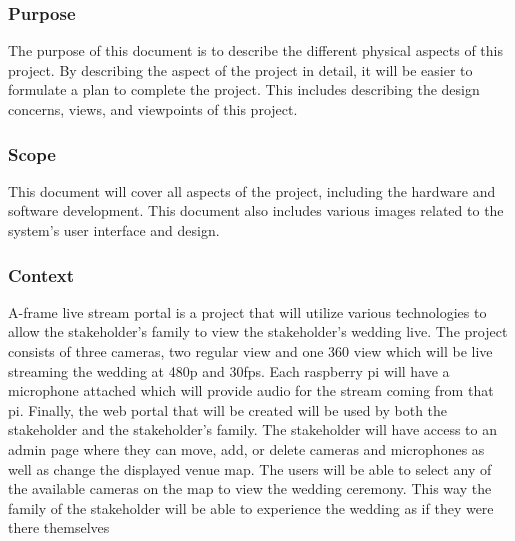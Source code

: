 \documentclass[onecolumn, draftclsnofoot,10pt, compsoc]{IEEEtran}
\begin{document}
    \subsubsection{Purpose}
    The purpose of this document is to describe the different physical aspects of this project.
    By describing the aspect of the project in detail, it will be easier to formulate a plan to complete the project.
    This includes describing the design concerns, views, and viewpoints of this project.
    
    \subsubsection{Scope}
    This document will cover all aspects of the project, including the hardware and software development.
    This document also includes various images related to the system's user interface and design.
    
    \subsubsection{Context}
    A-frame live stream portal is a project that will utilize various technologies to allow the stakeholder's family to view the stakeholder's wedding live.
    The project consists of three cameras, two regular view and one 360 view which will be live streaming the wedding at 480p and 30fps. 
    Each raspberry pi will have a microphone attached which will provide audio for the stream coming from that pi.
    Finally, the web portal that will be created will be used by both the stakeholder and the stakeholder's family.
    The stakeholder will have access to an admin page where they can move, add, or delete cameras and microphones as well as change the displayed venue map.
    The users will be able to select any of the available cameras on the map to view the wedding ceremony.
    This way the family of the stakeholder will be able to experience the wedding as if they were there themselves
\end{document}
